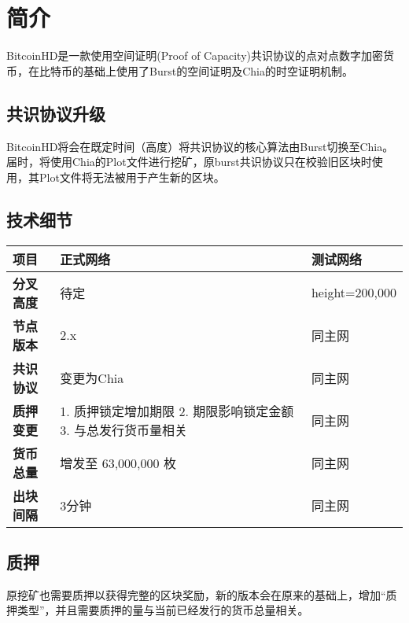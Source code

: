 \chapter{简介}
\begin{flushleft}
    BitcoinHD是一款使用空间证明(Proof of Capacity)共识协议的点对点数字加密货币，在比特币的基础上使用了Burst的空间证明及Chia的时空证明机制。
\end{flushleft}
\section{共识协议升级}
\begin{flushleft}
    BitcoinHD将会在既定时间（高度）将共识协议的核心算法由Burst切换至Chia。届时，将使用Chia的Plot文件进行挖矿，原burst共识协议只在校验旧区块时使用，其Plot文件将无法被用于产生新的区块。
\end{flushleft}
\section{技术细节}
\begin{tabular}{ |p{2cm}|p{7cm}|l| }
    \hline
    \rowcolor{lightgray} 项目 & 正式网络 & 测试网络 \\[5pt]
    \hline
    \rowcolor{lightgray!30} \textbf{分叉高度} & 待定 & height=200,000 \\[5pt]
    \textbf{节点版本} & 2.x & 同主网 \\[5pt]
    \rowcolor{lightgray!30} \textbf{共识协议} & 变更为Chia & 同主网 \\[5pt]
    \textbf{质押变更} & 1. 质押锁定增加期限 2. 期限影响锁定金额 3. 与总发行货币量相关 & 同主网 \\[5pt]
    \rowcolor{lightgray!30} \textbf{货币总量} & 增发至 63,000,000 枚 & 同主网 \\[5pt]
    \textbf{出块间隔} & 3分钟 & 同主网 \\[5pt]
    \hline
\end{tabular}
\section{质押}
\begin{flushleft}
    原挖矿也需要质押以获得完整的区块奖励，新的版本会在原来的基础上，增加``质押类型''，并且需要质押的量与当前已经发行的货币总量相关。
\end{flushleft}
